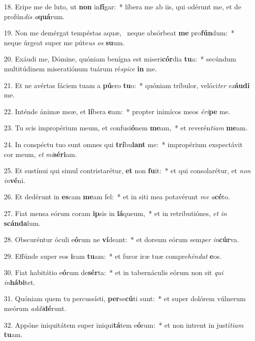 18. Eripe me de luto, ut \textbf{non} in\textbf{fí}gar:~*  líbera me ab iis, qui odérunt me, et de profún\textit{dis} \textit{a}\textbf{quá}rum.\

19. Non me demérgat tempéstas aquæ, \dag\  neque absórbeat \textbf{me} pro\textbf{fún}dum:~*  neque úrgeat super me púte\textit{us} \textit{os} \textbf{su}um.\

20. Exáudi me, Dómine, quóniam benígna est miseri\textbf{cór}dia \textbf{tu}a:~*  secúndum multitúdinem miseratiónum tuárum ré\textit{spi}\textit{ce} \textbf{in} me.\

21. Et ne avértas fáciem tuam a \textbf{pú}ero \textbf{tu}o:~*  quóniam tríbulor, velóci\textit{ter} \textit{ex}\textbf{áu}\textbf{di} me.\

22. Inténde ánimæ meæ, et \textbf{lí}bera \textbf{e}am:~*  propter inimícos meos \textit{é}\textit{ri}\textbf{pe} me.\

23. Tu scis impropérium meum, et confusi\textbf{ó}nem \textbf{me}am,~*  et reverén\textit{ti}\textit{am} \textbf{me}am.\

24. In conspéctu tuo sunt omnes qui \textbf{trí}bu\textbf{lant} me:~*  impropérium exspectávit cor meum, \textit{et} \textit{mi}\textbf{sé}\textbf{ri}am.\

25. Et sustínui qui simul contristarétur, \textbf{et} non \textbf{fu}it:~*  et qui consolarétur, et \textit{non} \textit{in}\textbf{vé}ni.\

26. Et dedérunt in \textbf{es}cam \textbf{me}am fel:~*  et in siti mea potavérunt \textit{me} \textit{a}\textbf{cé}to.\

27. Fiat mensa eórum coram \textbf{ip}sis in \textbf{lá}queum,~*  et in retributiónes, \textit{et} \textit{in} \textbf{scán}\textbf{da}lum.\

28. Obscuréntur óculi e\textbf{ó}rum ne \textbf{ví}deant:~*  et dorsum eórum sem\textit{per} \textit{in}\textbf{cúr}va.\

29. Effúnde super eos \textbf{i}ram \textbf{tu}am:~*  et furor iræ tuæ compre\textit{hén}\textit{dat} \textbf{e}os.\

30. Fiat habitátio e\textbf{ó}rum de\textbf{sér}ta:~*  et in tabernáculis eórum non sit \textit{qui} \textit{in}\textbf{há}\textbf{bi}tet.\

31. Quóniam quem tu percussísti, \textbf{per}se\textbf{cú}ti sunt:~*  et super dolórem vúlnerum meórum \textit{ad}\textit{di}\textbf{dé}runt.\

32. Appóne iniquitátem super iniqui\textbf{tá}tem e\textbf{ó}rum:~*  et non intrent in justí\textit{ti}\textit{am} \textbf{tu}am.\

